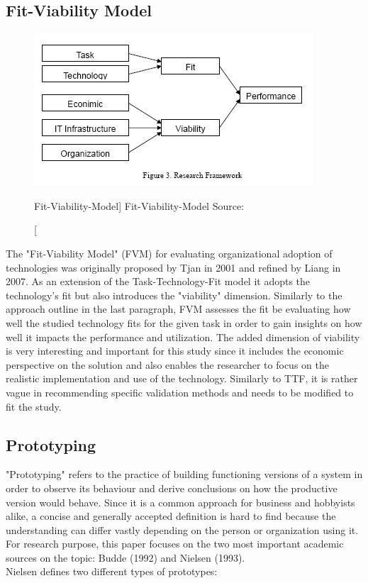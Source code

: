     \subsection{Fit-Viability Model}
    \begin{figure}[ht]
        \includegraphics[width=0.7\linewidth]{images/methodology/fvm.jpg}\centering
        \caption
        [Fit-Viability-Model]
        {Fit-Viability-Model Source: \cite{Liang2007AdoptionModel}}
    \end{figure}
    The "Fit-Viability Model" (FVM) for evaluating organizational adoption of technologies was originally proposed by Tjan in 2001 and refined by Liang in 2007. As an extension of the Task-Technology-Fit model it adopts the technology's fit but also introduces the "viability" dimension. Similarly to the approach outline in the last paragraph, FVM assesses the fit be evaluating how well the studied technology fits for the given task in order to gain insights on how well it impacts the performance and utilization. The added dimension of viability is very interesting and important for this study since it includes the economic perspective on the solution and also enables the researcher to focus on the realistic implementation and use of the technology. Similarly to TTF, it is rather vague in recommending specific validation methods and needs to be modified to fit the study. 
    
    \subsection{Prototyping}
    "Prototyping" refers to the practice of building functioning versions of a system in order to observe its behaviour and derive conclusions on how the productive version would behave.\autocite{Budde1992Prototyping} Since it is a common approach for business and hobbyists alike, a concise and generally accepted definition is hard to find because the understanding can differ vastly depending on the person or organization using it. For research purpose, this paper focuses on the two most important academic sources on the topic: Budde (1992) and Nielsen (1993).\\
    Nielsen defines two different types of prototypes:
    
